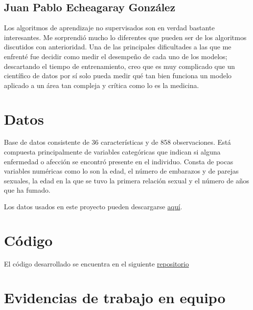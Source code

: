 \documentclass[journal]{IEEEtran}
\begin{document}
        \subsection{Juan Pablo Echeagaray González}

                Los algoritmos de aprendizaje no supervisados son en verdad bastante interesantes. Me sorprendió mucho lo diferentes que pueden ser de los algoritmos discutidos con anterioridad. Una de las principales dificultades a las que me enfrenté fue decidir como medir el desempeño de cada uno de los modelos; descartando el tiempo de entrenamiento, creo que es muy complicado que un científico de datos por sí solo pueda medir qué tan bien funciona un modelo aplicado a un área tan compleja y crítica como lo es la medicina.
        
    \appendices
    
    \section{Datos} \label{data}

        Base de datos consistente de 36 características y de 858 observaciones. Está compuesta principalmente de variables categóricas que indican si alguna enfermedad o afección se encontró presente en el individuo. Consta de pocas variables numéricas como lo son la edad, el número de embarazos y de parejas sexuales, la edad en la que se tuvo la primera relación sexual y el número de años que ha fumado.

        Los datos usados en este proyecto pueden descargarse \href{https://www.kaggle.com/code/ravaliraj/risk-classification-of-cervical-cancer}{aquí}.

    \section{Código} \label{code}

        El código desarrollado se encuentra en el siguiente \href{https://github.com/JuanEcheagaray75/cancer-clf}{repositorio}

    \section{Evidencias de trabajo en equipo}


    
    
\end{document}
